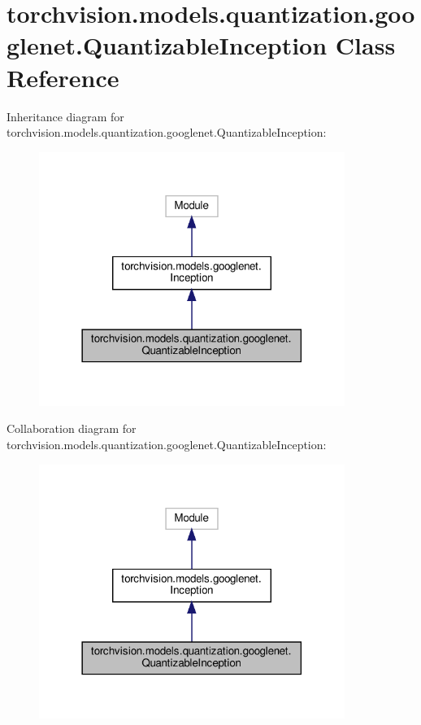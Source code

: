 \hypertarget{classtorchvision_1_1models_1_1quantization_1_1googlenet_1_1QuantizableInception}{}\section{torchvision.\+models.\+quantization.\+googlenet.\+Quantizable\+Inception Class Reference}
\label{classtorchvision_1_1models_1_1quantization_1_1googlenet_1_1QuantizableInception}


Inheritance diagram for torchvision.\+models.\+quantization.\+googlenet.\+Quantizable\+Inception\+:
\nopagebreak
\begin{figure}[H]
\begin{center}
\leavevmode
\includegraphics[width=282pt]{classtorchvision_1_1models_1_1quantization_1_1googlenet_1_1QuantizableInception__inherit__graph}
\end{center}
\end{figure}


Collaboration diagram for torchvision.\+models.\+quantization.\+googlenet.\+Quantizable\+Inception\+:
\nopagebreak
\begin{figure}[H]
\begin{center}
\leavevmode
\includegraphics[width=282pt]{classtorchvision_1_1models_1_1quantization_1_1googlenet_1_1QuantizableInception__coll__graph}
\end{center}
\end{figure}

